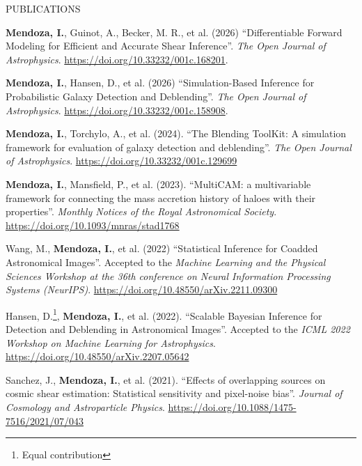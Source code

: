 \documentclass{resume} %
\begin{document}
\begin{rSection}{PUBLICATIONS}
%
\vspace*{-1em}

\item \textbf{Mendoza, I.}, Guinot, A., Becker, M. R., et al. (2026) ``Differentiable Forward Modeling for Efficient and Accurate Shear Inference''. \textit{The Open Journal of Astrophysics}. \url{https://doi.org/10.33232/001c.168201}.

\item \textbf{Mendoza, I.}, Hansen, D., et al. (2026) ``Simulation-Based Inference for Probabilistic Galaxy Detection and Deblending''. \textit{The Open Journal of Astrophysics}. \url{https://doi.org/10.33232/001c.158908}.

\item \textbf{Mendoza, I.}, Torchylo, A., et al. (2024). ``The Blending ToolKit: A simulation framework for evaluation of galaxy detection and deblending''. \textit{The Open Journal of Astrophysics}. \url{https://doi.org/10.33232/001c.129699}

\item \textbf{Mendoza, I.}, Mansfield, P., et al. (2023). ``MultiCAM: a multivariable framework for connecting the mass accretion history of haloes with their properties''. \textit{Monthly Notices of the Royal Astronomical Society}. \url{ 	
https://doi.org/10.1093/mnras/stad1768}

\item Wang, M., \textbf{Mendoza, I.}, et al. (2022) ``Statistical Inference for Coadded Astronomical Images''. Accepted to the \textit{Machine Learning and the Physical Sciences Workshop at the 36th conference on Neural Information Processing Systems (NeurIPS)}. \url{https://doi.org/10.48550/arXiv.2211.09300}

\item Hansen, D.\footnote[1]{\label{ft:equal}Equal contribution}, \textbf{Mendoza, I.}, et al. (2022). ``Scalable Bayesian Inference for Detection and Deblending in Astronomical Images''. Accepted to the \textit{ICML 2022 Workshop on Machine Learning for Astrophysics}. \url{https://doi.org/10.48550/arXiv.2207.05642}

\item Sanchez, J., \textbf{Mendoza, I.}, et al. (2021). ``Effects of overlapping sources on cosmic shear estimation: Statistical sensitivity and pixel-noise bias''. \textit{Journal of Cosmology and Astroparticle Physics}. \url{https://doi.org/10.1088/1475-7516/2021/07/043}

\end{rSection}
\end{document}
